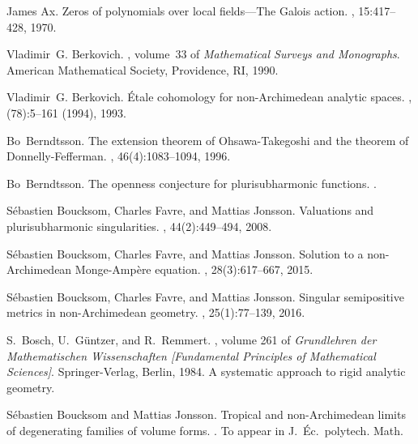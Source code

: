 \documentclass[10pt,reqno]{amsart}
\theoremstyle{plain}
\theoremstyle{definition}
\numberwithin{equation}{section}
\begin{document}
 \begin{thebibliography}{BRG84}
 
James Ax.
\newblock Zeros of polynomials over local fields---{T}he {G}alois action.
, 15:417--428, 1970.

Vladimir~G. Berkovich.
, volume~33 of {\em Mathematical Surveys and Monographs}.
\newblock American Mathematical Society, Providence, RI, 1990.

Vladimir~G. Berkovich.
\newblock \'{E}tale cohomology for non-{A}rchimedean analytic spaces.
, (78):5--161 (1994),
  1993.

Bo~Berndtsson.
\newblock The extension theorem of {O}hsawa-{T}akegoshi and the theorem of
  {D}onnelly-{F}efferman.
, 46(4):1083--1094, 1996.

Bo~Berndtsson.
\newblock The openness conjecture for plurisubharmonic functions.
.

S{\'e}bastien Boucksom, Charles Favre, and Mattias Jonsson.
\newblock Valuations and plurisubharmonic singularities.
, 44(2):449--494, 2008.

S{\'e}bastien Boucksom, Charles Favre, and Mattias Jonsson.
\newblock Solution to a non-{A}rchimedean {M}onge-{A}mp\`ere equation.
, 28(3):617--667, 2015.

S{\'e}bastien Boucksom, Charles Favre, and Mattias Jonsson.
\newblock Singular semipositive metrics in non-{A}rchimedean geometry.
, 25(1):77--139, 2016.

S.~Bosch, U.~G{\"u}ntzer, and R.~Remmert.
, volume 261 of {\em Grundlehren der
  Mathematischen Wissenschaften [Fundamental Principles of Mathematical
  Sciences]}.
\newblock Springer-Verlag, Berlin, 1984.
\newblock A systematic approach to rigid analytic geometry.

S{\'e}bastien Boucksom and Mattias Jonsson.
\newblock Tropical and non-{A}rchimedean limits of degenerating families of
  volume forms.
. To appear in J.\ \'{E}c.\ polytech. Math.


\end{thebibliography}
\end{document}
